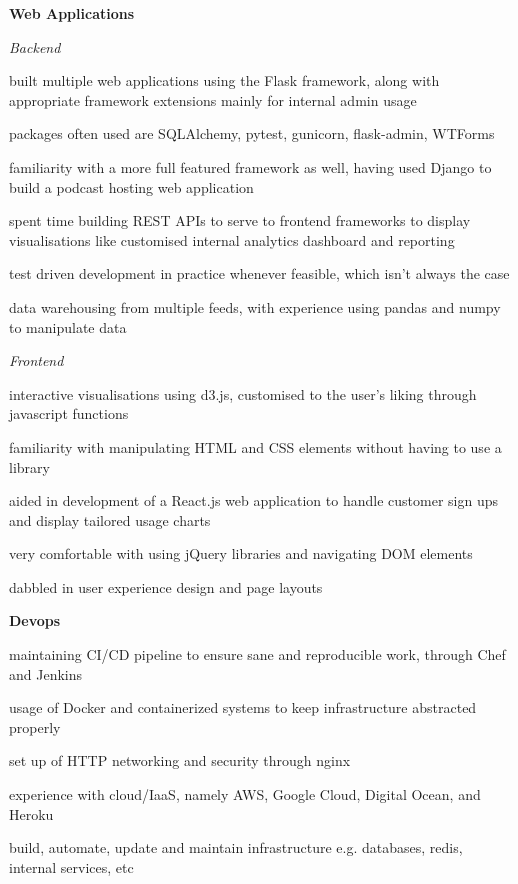 \documentclass[10pt]{article}
\newenvironment{outerlist}[1][\enskip\textperiodcentered
]%
        {\begin{itemize}[#1]}{\end{itemize}%
         \vspace{-.6\baselineskip}}
\newenvironment{innerlist}[1][\enskip\textperiodcentered
]%
        {\begin{compactitem}[#1]}{\end{compactitem}}
\newcommand{\blankline}{\quad\pagebreak[2]}
\begin{document}
{\textbf{Web Applications}}
\begin{outerlist}
\item[] \textit{Backend}
\begin{innerlist}
\item built multiple web applications using the Flask framework, along with appropriate framework extensions mainly for internal admin usage
\item packages often used are SQLAlchemy, pytest, gunicorn, flask-admin, WTForms
\item familiarity with a more full featured framework as well, having used Django to build a podcast hosting web application
\item spent time building REST APIs to serve to frontend frameworks to display visualisations like customised internal analytics dashboard and reporting
\item test driven development in practice whenever feasible, which isn't always the case
\item data warehousing from multiple feeds, with experience using pandas and numpy to manipulate data
\end{innerlist}
\item[] \textit{Frontend}
\begin{innerlist}
\item interactive visualisations using d3.js, customised to the user's liking through javascript functions
\item familiarity with manipulating HTML and CSS elements without having to use a library
\item aided in development of a React.js web application to handle customer sign ups and display tailored usage charts
\item very comfortable with using jQuery libraries and navigating DOM elements
\item dabbled in user experience design and page layouts
\end{innerlist}
\end{outerlist}

\blankline

{\textbf{Devops}}
\begin{innerlist}
\item maintaining CI/CD pipeline to ensure sane and reproducible work, through Chef and Jenkins
\item usage of Docker and containerized systems to keep infrastructure abstracted properly
\item set up of HTTP networking and security through nginx
\item experience with cloud/IaaS, namely AWS, Google Cloud, Digital Ocean, and Heroku
\item build, automate, update and maintain infrastructure e.g. databases, redis, internal services, etc
\end{innerlist}
\end{document}
